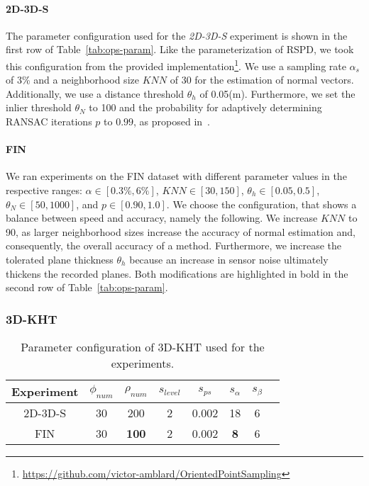 \documentclass[main.tex]{subfiles}
\begin{document}
\paragraph{2D-3D-S}
The parameter configuration used for the \textit{2D-3D-S} experiment is shown in the first row of Table~\ref{tab:ops-param}.
Like the parameterization of RSPD, we took this configuration from the provided implementation\footnote{\href{https://github.com/victor-amblard/OrientedPointSampling}{https://github.com/victor-amblard/OrientedPointSampling}}.
We use a sampling rate $\alpha_s$ of 3\% and a neighborhood size $KNN$ of 30 for the estimation of normal vectors.
Additionally, we use a distance threshold $\theta_h$ of 0.05(m).
Furthermore, we set the inlier threshold $\theta_N$ to 100 and the probability for adaptively determining RANSAC iterations
$p$ to $0.99$, as proposed in~\cite[Section~4A]{Sun_Mordohai_2019}.

\paragraph{FIN}
We ran experiments on the FIN dataset with different parameter values in the respective ranges:
$\alpha\in[0.3\%, 6\%]$, $KNN\in[30, 150]$, $\theta_h\in[0.05, 0.5]$, $\theta_N\in[50, 1000]$, and $p\in[0.90, 1.0]$.
We choose the configuration, that shows a balance between speed and accuracy, namely the following.
We increase $KNN$ to 90, as larger neighborhood sizes increase the accuracy of normal estimation and,
consequently, the overall accuracy of a method.
Furthermore, we increase the tolerated plane thickness $\theta_h$ because an increase in sensor noise ultimately thickens the recorded planes.
Both modifications are highlighted in bold in the second row of Table~\ref{tab:ops-param}.

\subsubsection{3D-KHT}
\begin{table}[H]
    \centering
    \begin{tabular}{c|ccccccc}
        Experiment & $\phi_{num}$ & $\rho_{num}$ & $s_{level}$ & $s_{ps}$ & $s_\alpha$ & $s_\beta$ \\ \hline
        2D-3D-S    & 30           & 200          & 2           & 0.002    & 18         & 6         \\
        FIN        & 30           & \textbf{100} & 2           & 0.002    & \textbf{8} & 6
    \end{tabular}%
    \caption{Parameter configuration of 3D-KHT used for the experiments.}
    \label{tab:3dkht-param}
\end{table}
\end{document}
